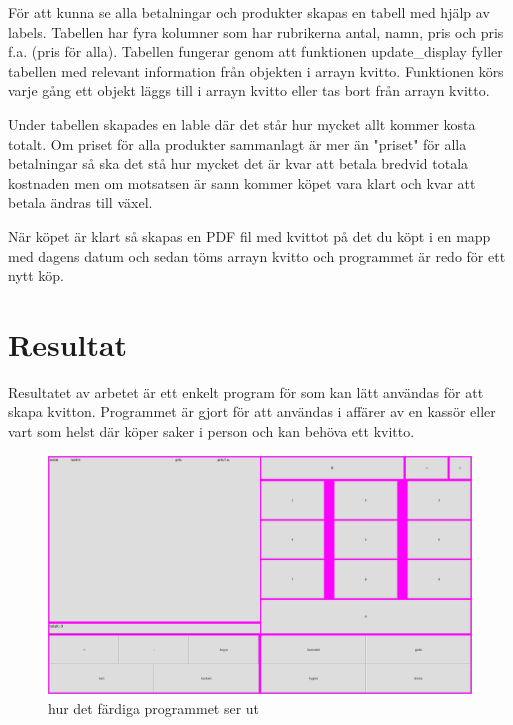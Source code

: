 \documentclass[a4paper, 12pt]{article}
\begin{document}
För att kunna se alla betalningar och produkter skapas en tabell med hjälp av labels. Tabellen har fyra kolumner som har rubrikerna antal, namn, pris och pris f.a. (pris för alla).
Tabellen fungerar genom att funktionen update\_display fyller tabellen med relevant information från objekten i arrayn kvitto. Funktionen körs varje gång ett objekt läggs till i arrayn kvitto eller tas bort från arrayn kvitto.


Under tabellen skapades en lable där det står hur mycket allt kommer kosta totalt. Om priset för alla produkter sammanlagt är mer än "priset" för alla betalningar så ska det stå hur mycket det är kvar att betala bredvid totala kostnaden men om motsatsen är sann kommer köpet vara klart och kvar att betala ändras till växel. 


När köpet är klart så skapas en PDF fil med kvittot på det du köpt i en mapp med dagens datum och sedan töms arrayn kvitto och programmet är redo för ett nytt köp.


\section{Resultat}

Resultatet av arbetet är ett enkelt program för som kan lätt användas för att skapa kvitton.
Programmet är gjort för att användas i affärer av en kassör eller vart som helst där köper saker i person och kan behöva ett kvitto.

\begin{figure}[h!]
  \includegraphics[width=\linewidth]{img/ferdig.png}
  \caption{ hur det färdiga programmet ser ut}
  \label{fig:färdig}
\end{figure}
\end{document}
